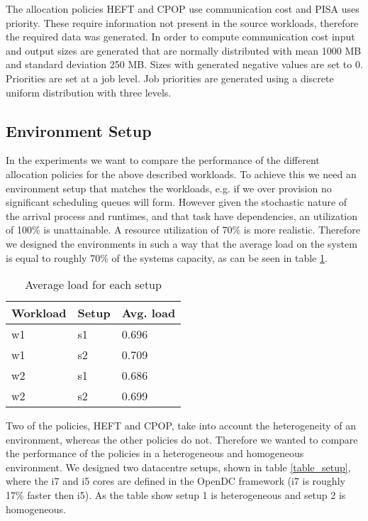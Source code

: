 \documentclass[twocolumn,a4]{scrartcl}
\begin{document}
The allocation policies HEFT and CPOP use communication cost and PISA uses priority. These require information not present in the source workloads, therefore the required data was generated. In order to compute communication cost input and output sizes are generated that are normally distributed with mean 1000 MB and standard deviation 250 MB. Sizes with generated negative values are set to 0. Priorities are set at a job level. Job priorities are generated using a discrete uniform distribution with three levels.


\subsection{Environment Setup} \label{sec_environment_setup}

In the experiments we want to compare the performance of the different allocation policies for the above described workloads. To achieve this we need an environment setup that matches the workloads, e.g. if we over provision no significant scheduling queues will form. However given the stochastic nature of the arrival process and runtimes, and that task have dependencies, an utilization of 100\% is unattainable.  A resource utilization of 70\% is more realistic. \cite{DBLP:conf/ipps/JonesN99} Therefore we designed the environments in such a way that the average load on the system is equal to roughly 70\% of the systems capacity, as can be seen in table \ref{table_setup_load}.

\begin{table}[h]
\begin{tabular}{l | l | l}
  \textbf{Workload} & \textbf{Setup} & \textbf{Avg. load} \\
  \hline
  w1 & s1 & 0.696 \\
  w1 & s2 & 0.709 \\
  \hline
  w2 & s1 & 0.686 \\
  w2 & s2 & 0.699 \\
\end{tabular}
\caption{Average load for each setup}
\label{table_setup_load}
\end{table}

Two of the policies, HEFT and CPOP, take into account the heterogeneity of an environment, whereas the other policies do not. Therefore we wanted to compare the performance of the policies in a heterogeneous and homogeneous environment. We designed two datacentre setups, shown in table \ref{table_setup}, where the i7 and i5 cores are defined in the OpenDC framework (i7 is roughly 17\% faster then i5). As the table show setup 1 is heterogeneous and setup 2 is homogeneous.
\end{document}
